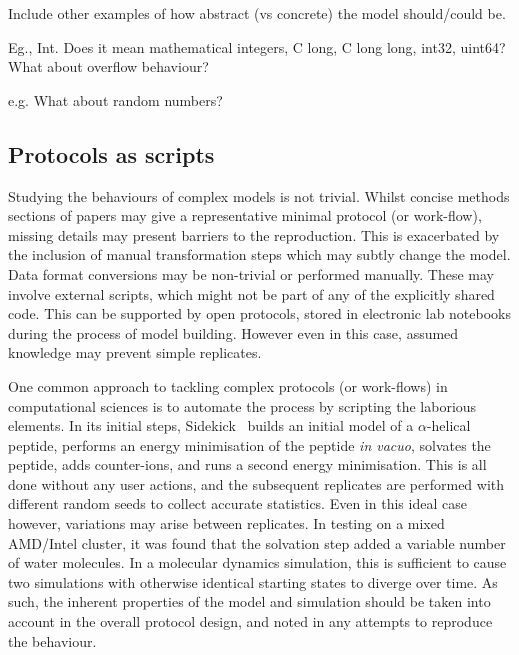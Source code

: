 \documentclass[conference]{IEEEtran}
\begin{document}
Include other examples of how abstract (vs concrete) the model should/could be. 

Eg., Int. Does it mean mathematical integers, C long, C long long, int32, uint64? 
What about overflow behaviour? 

e.g. What about random numbers?




\subsection{Protocols as scripts}



Studying the behaviours of complex models is not trivial. Whilst 
concise methods sections of papers may give a representative minimal
protocol (or work-flow), missing details may present barriers to 
the reproduction. This is exacerbated by the inclusion of manual 
transformation steps which may subtly change the model. Data format 
conversions may be non-trivial or performed manually. These may 
involve external scripts, which might not be part of any of the
explicitly shared code. This can be supported by open protocols, stored 
in electronic lab notebooks during the process of model building. However
even in this case, assumed knowledge may prevent simple replicates.

One common approach to tackling complex protocols (or work-flows) 
in computational sciences is to automate the process by scripting
the laborious elements. In its initial steps, Sidekick~\cite{Hall2014Sidekick}
builds an initial model of a $\alpha$-helical peptide, performs an
energy minimisation of the peptide \emph{in vacuo}, solvates the peptide,
adds counter-ions, and runs a second energy minimisation. This is all
done without any user actions, and the subsequent replicates are performed
with different random seeds to collect accurate statistics. Even in this 
ideal case however, variations may arise between replicates. In testing 
on a mixed AMD/Intel cluster, it was found that the solvation step added
a variable number of water molecules. In a molecular dynamics simulation, 
this is sufficient to cause two simulations with otherwise identical 
starting states to diverge over time. As such, the inherent properties
of the model and simulation should be taken into account in the overall
protocol design, and noted in any attempts to reproduce the behaviour.
\end{document}

